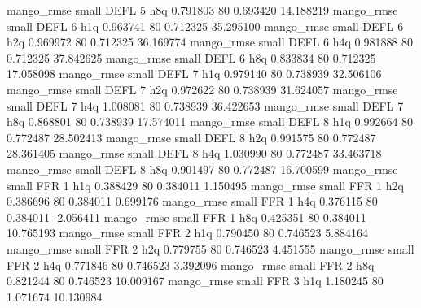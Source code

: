        mango_rmse      small     DEFL                 5                  h8q 0.791803 80       0.693420          14.188219
       mango_rmse      small     DEFL                 6                  h1q 0.963741 80       0.712325          35.295100
       mango_rmse      small     DEFL                 6                  h2q 0.969972 80       0.712325          36.169774
       mango_rmse      small     DEFL                 6                  h4q 0.981888 80       0.712325          37.842625
       mango_rmse      small     DEFL                 6                  h8q 0.833834 80       0.712325          17.058098
       mango_rmse      small     DEFL                 7                  h1q 0.979140 80       0.738939          32.506106
       mango_rmse      small     DEFL                 7                  h2q 0.972622 80       0.738939          31.624057
       mango_rmse      small     DEFL                 7                  h4q 1.008081 80       0.738939          36.422653
       mango_rmse      small     DEFL                 7                  h8q 0.868801 80       0.738939          17.574011
       mango_rmse      small     DEFL                 8                  h1q 0.992664 80       0.772487          28.502413
       mango_rmse      small     DEFL                 8                  h2q 0.991575 80       0.772487          28.361405
       mango_rmse      small     DEFL                 8                  h4q 1.030990 80       0.772487          33.463718
       mango_rmse      small     DEFL                 8                  h8q 0.901497 80       0.772487          16.700599
       mango_rmse      small      FFR                 1                  h1q 0.388429 80       0.384011           1.150495
       mango_rmse      small      FFR                 1                  h2q 0.386696 80       0.384011           0.699176
       mango_rmse      small      FFR                 1                  h4q 0.376115 80       0.384011          -2.056411
       mango_rmse      small      FFR                 1                  h8q 0.425351 80       0.384011          10.765193
       mango_rmse      small      FFR                 2                  h1q 0.790450 80       0.746523           5.884164
       mango_rmse      small      FFR                 2                  h2q 0.779755 80       0.746523           4.451555
       mango_rmse      small      FFR                 2                  h4q 0.771846 80       0.746523           3.392096
       mango_rmse      small      FFR                 2                  h8q 0.821244 80       0.746523          10.009167
       mango_rmse      small      FFR                 3                  h1q 1.180245 80       1.071674          10.130984
